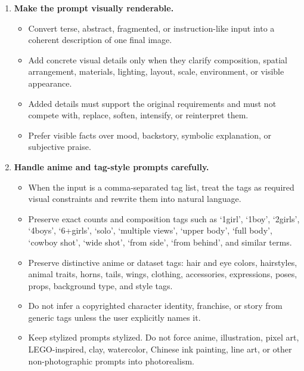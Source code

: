 \documentclass{llmxive}
\begin{document}
\begin{tcolorbox}
\begin{enumerate}[leftmargin=1.5em, itemsep=0.2em, topsep=0.2em, parsep=0pt, partopsep=0pt]
    \item \textbf{Make the prompt visually renderable.}
    \begin{itemize}[leftmargin=1.5em, itemsep=0pt, topsep=0pt, parsep=0pt, partopsep=0pt]
        \item Convert terse, abstract, fragmented, or instruction-like input into a coherent description of one final image.
        \item Add concrete visual details only when they clarify composition, spatial arrangement, materials, lighting, layout, scale, environment, or visible appearance.
        \item Added details must support the original requirements and must not compete with, replace, soften, intensify, or reinterpret them.
        \item Prefer visible facts over mood, backstory, symbolic explanation, or subjective praise.
    \end{itemize}

    \item \textbf{Handle anime and tag-style prompts carefully.}
    \begin{itemize}[leftmargin=1.5em, itemsep=0pt, topsep=0pt, parsep=0pt, partopsep=0pt]
        \item When the input is a comma-separated tag list, treat the tags as required visual constraints and rewrite them into natural language.
        \item Preserve exact counts and composition tags such as `1girl', `1boy', `2girls', `4boys', `6+girls', `solo', `multiple views', `upper body', `full body', `cowboy shot', `wide shot', `from side', `from behind', and similar terms.
        \item Preserve distinctive anime or dataset tags: hair and eye colors, hairstyles, animal traits, horns, tails, wings, clothing, accessories, expressions, poses, props, background type, and style tags.
        \item Do not infer a copyrighted character identity, franchise, or story from generic tags unless the user explicitly names it.
        \item Keep stylized prompts stylized. Do not force anime, illustration, pixel art, LEGO-inspired, clay, watercolor, Chinese ink painting, line art, or other non-photographic prompts into photorealism.
    \end{itemize}


\end{enumerate}
\end{tcolorbox}
\end{document}
